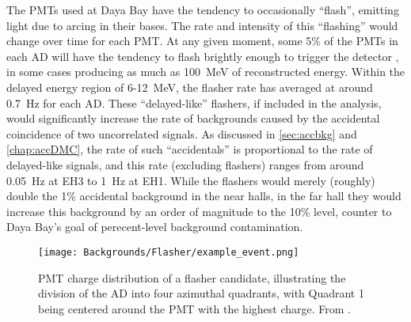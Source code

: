 \documentclass[../thesis.tex]{subfiles}
\begin{document}
The PMTs used at Daya Bay have the tendency to occasionally ``flash'', emitting light due to arcing in their bases. The rate and intensity of this ``flashing'' would change over time for each PMT. At any given moment, some 5\% of the PMTs in each AD will have the tendency to flash brightly enough to trigger the detector \cite{SideBySide}, in some cases producing as much as 100~MeV of reconstructed energy. Within the delayed energy region of 6-12~MeV, the flasher rate has averaged at around 0.7~Hz for each AD. These ``delayed-like'' flashers, if included in the analysis, would significantly increase the rate of backgrounds caused by the accidental coincidence of two uncorrelated signals. As discussed in \autoref{sec:accbkg} and \autoref{chap:accDMC}, the rate of such ``accidentals'' is proportional to the rate of delayed-like signals, and this rate (excluding flashers) ranges from around 0.05~Hz at EH3 to 1~Hz at EH1. While the flashers would merely (roughly) double the 1\% accidental background in the near halls, in the far hall they would increase this background by an order of magnitude to the 10\% level, counter to Daya Bay's goal of perecent-level background contamination.

\begin{figure}[h!]
  \texttt{[image: Backgrounds/Flasher/example\_event.png]}
  \caption{PMT charge distribution of a flasher candidate, illustrating the division of the AD into four azimuthal quadrants, with Quadrant 1 being centered around the PMT with the highest charge. From \cite{An_2017}.}
  \label{fig:flasher_exampleOverview}
\end{figure}
\end{document}
